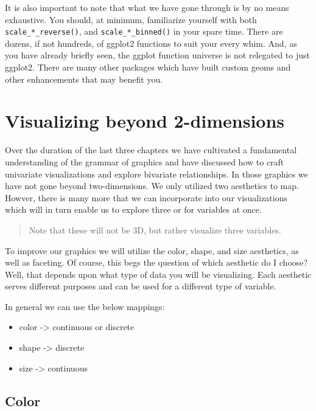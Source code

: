 \documentclass[
]{book}
\providecommand{\tightlist}{%
  \setlength{\itemsep}{0pt}\setlength{\parskip}{0pt}}
\begin{document}
It is also important to note that what we have gone through is by no means exhaustive. You should, at minimum, familiarize yourself with both \texttt{scale\_*\_reverse()}, and \texttt{scale\_*\_binned()} in your spare time. There are dozens, if not hundreds, of ggplot2 functions to suit your every whim. And, as you have already briefly seen, the ggplot function universe is not relegated to just ggplot2. There are many other packages which have built custom geoms and other enhancements that may benefit you.

\hypertarget{visualizing-beyond-2-dimensions}{%
\chapter{Visualizing beyond 2-dimensions}\label{visualizing-beyond-2-dimensions}}

Over the duration of the last three chapters we have cultivated a fundamental understanding of the grammar of graphics and have discussed how to craft univariate visualizations and explore bivariate relationships. In those graphics we have not gone beyond two-dimensions. We only utilized two aesthetics to map. Howver, there is many more that we can incorporate into our visualizations which will in turn enable us to explore three or for variables at once.

\begin{quote}
Note that these will not be 3D, but rather visualize three variables.
\end{quote}

To improve our graphics we will utilize the color, shape, and size aesthetics, as well as faceting. Of course, this begs the question of which aesthetic do I choose? Well, that depends upon what type of data you will be visualizing. Each aesthetic serves different purposes and can be used for a different type of variable.

In general we can use the below mappings:

\begin{itemize}
\tightlist
\item
  color -\textgreater{} continuous or discrete
\item
  shape -\textgreater{} discrete
\item
  size -\textgreater{} continuous
\end{itemize}

\hypertarget{color}{%
\section{Color}\label{color}}
\end{document}
